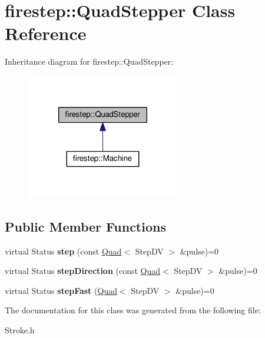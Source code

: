 \hypertarget{classfirestep_1_1_quad_stepper}{\section{firestep\+:\+:Quad\+Stepper Class Reference}
\label{classfirestep_1_1_quad_stepper}
}


Inheritance diagram for firestep\+:\+:Quad\+Stepper\+:\nopagebreak
\begin{figure}[H]
\begin{center}
\leavevmode
\includegraphics[width=190pt]{classfirestep_1_1_quad_stepper__inherit__graph}
\end{center}
\end{figure}
\subsection*{Public Member Functions}
\begin{DoxyCompactItemize}
\item 
\hypertarget{classfirestep_1_1_quad_stepper_a47fa70b513f25cec74dc14edceef9dca}{virtual Status {\bfseries step} (const \hyperlink{classfirestep_1_1_quad}{Quad}$<$ Step\+D\+V $>$ \&pulse)=0}\label{classfirestep_1_1_quad_stepper_a47fa70b513f25cec74dc14edceef9dca}

\item 
\hypertarget{classfirestep_1_1_quad_stepper_ab77cb4b78de276559e8a0eba8fc1ed7d}{virtual Status {\bfseries step\+Direction} (const \hyperlink{classfirestep_1_1_quad}{Quad}$<$ Step\+D\+V $>$ \&pulse)=0}\label{classfirestep_1_1_quad_stepper_ab77cb4b78de276559e8a0eba8fc1ed7d}

\item 
\hypertarget{classfirestep_1_1_quad_stepper_af4305a3a52466725955de14b196094e2}{virtual Status {\bfseries step\+Fast} (\hyperlink{classfirestep_1_1_quad}{Quad}$<$ Step\+D\+V $>$ \&pulse)=0}\label{classfirestep_1_1_quad_stepper_af4305a3a52466725955de14b196094e2}

\end{DoxyCompactItemize}


The documentation for this class was generated from the following file\+:\begin{DoxyCompactItemize}
\item 
Stroke.\+h\end{DoxyCompactItemize}
